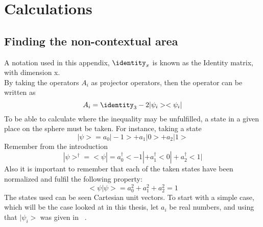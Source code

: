 \chapter{Calculations}\label{cha:Calculations}
\section{Finding the non-contextual area}
A notation used in this appendix, $\identity_x$ is known as the Identity matrix, with dimension x. \\
By taking the operators $A_i$ as projector operators, then the operator can be written as 
\begin{equation} \label{eq:Defop}
A_i = \identity_3 - 2 |\psi_i><\psi_i|  
\end{equation}
To be able to calculate where the inequality may be unfulfilled, a state in a given place on the sphere must be taken.
For instance, taking a state 
\begin{equation}
|\psi> = a_0|-1>+a_1|0>+a_2|1> 
\end{equation}
Remember from the introduction~
\begin{equation}
|\psi>^\dagger = <\psi|=a_0^\dagger<-1|+a_1^\dagger<0|+a_2^\dagger<1| 
\end{equation}
Also it is important to remember that each of the taken states have been normalized and fulfil the following property:
\begin{equation}
<\psi|\psi> = a_0^2+a_1^2+a_2^2 = 1 
\end{equation}
The states used can be seen Cartesian unit vectors. To start with a simple case, which will be the case looked at in this thesis, let $a_i$ be real numbers, and using that $|\psi_i>$ was given in ~.

